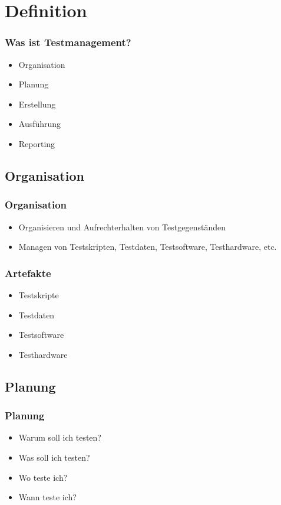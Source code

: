 \section{Definition}
\begin{frame}
	\frametitle{Was ist Testmanagement?}
	\begin{itemize}
		\item Organisation
		\item Planung
		\item Erstellung
		\item Ausf\"uhrung
		\item Reporting
	\end{itemize}
\end{frame}

\subsection{Organisation}
\begin{frame}
	\frametitle{Organisation}
	\begin{itemize}
		\item Organisieren und Aufrechterhalten von Testgegenst\"anden
		\item Managen von Testskripten, Testdaten, Testsoftware, Testhardware, etc.
	\end{itemize}
\end{frame}

\begin{frame}
	\frametitle{Artefakte}
	\begin{itemize}
		\item Testskripte
		\item Testdaten
		\item Testsoftware
		\item Testhardware
	\end{itemize}
\end{frame}

\subsection{Planung}
\begin{frame}
	\frametitle{Planung}
	\begin{itemize}
		\item Warum soll ich testen?
		\item Was soll ich testen?
		\item Wo teste ich?
		\item Wann teste ich?
	\end{itemize}
\end{frame}

